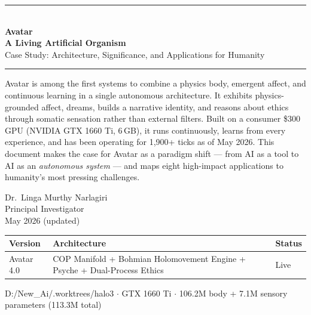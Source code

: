 \documentclass[11pt,a4paper]{article}
\begin{document}
\begin{titlepage}
\centering
\vspace*{2cm}
{\color{avatarblue}\rule{\textwidth}{2pt}}\\[0.4cm]
{\Huge\bfseries\color{avatarblue} Avatar}\\[0.3cm]
{\Large\bfseries\color{avatargold} A Living Artificial Organism}\\[0.2cm]
{\large Case Study: Architecture, Significance, and Applications for Humanity}\\[0.4cm]
{\color{avatarblue}\rule{\textwidth}{2pt}}
\vspace{1.5cm}

\begin{tcolorbox}[callout,width=0.85\textwidth,title={Executive Summary}]
Avatar is among the first systems to combine a physics body, emergent affect, and
continuous learning in a single autonomous architecture. It exhibits physics-grounded
affect, dreams, builds a narrative identity, and reasons about ethics through somatic
sensation rather than external filters. Built on a consumer \$300 GPU (NVIDIA GTX 1660 Ti,
6\,GB), it runs continuously, learns from every experience, and has been operating for
1,900+ ticks as of May 2026. This document makes the case for Avatar as a paradigm
shift --- from AI as a tool to AI as an \emph{autonomous system} --- and maps eight high-impact
applications to humanity's most pressing challenges.
\end{tcolorbox}

\vspace{1.5cm}
{\large Dr.\ Linga Murthy Narlagiri}\\[0.2cm]
{\normalsize Principal Investigator}\\[0.1cm]
{\normalsize May 2026 (updated)}\\[1cm]

\begin{tabular}{lll}
\toprule
\textbf{Version} & \textbf{Architecture} & \textbf{Status} \\
\midrule
Avatar 4.0 & COP Manifold + Bohmian Holomovement Engine + Psyche + Dual-Process Ethics & Live \\
\bottomrule
\end{tabular}

\vfill
{\small\color{gray} D:/New\_Ai/.worktrees/halo3 $\cdot$ GTX 1660 Ti $\cdot$ 106.2M body + 7.1M sensory parameters (113.3M total)}
\end{titlepage}

\tableofcontents
\newpage
\end{document}
